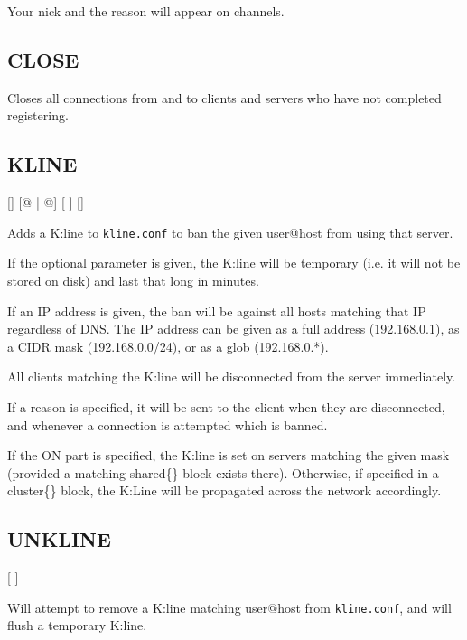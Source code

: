 	Your nick and the reason will appear on channels.


\subsection{CLOSE}


	Closes all connections from and to clients and servers who have not
	completed registering.


\subsection{KLINE}

    []
    [@ |
     @]
    [ ] []

	Adds a K:line to \nolinkurl{kline.conf} to ban the given user@host from
	using that server.

	If the optional parameter  is given, the K:line will
	be temporary (i.e. it will not be stored on disk) and last that long in
	minutes.

	If an IP address is given, the ban will be against all hosts matching
	that IP regardless of DNS. The IP address can be given as a full
	address (192.168.0.1), as a CIDR mask (192.168.0.0\slash24), or as a
	glob (192.168.0.*).

	All clients matching the K:line will be disconnected from the server
	immediately.

	If a reason is specified, it will be sent to the client when they are
	disconnected, and whenever a connection is attempted which is banned.


	If the ON part is specified, the K:line is set on servers matching the
	given mask (provided a matching shared\{\} block exists there).
	Otherwise, if specified in a cluster\{\} block, the K:Line will be
	propagated across the network accordingly.


\subsection{UNKLINE}

    [ ]

	Will attempt to remove a K:line matching user@host from
	\nolinkurl{kline.conf}, and will flush a temporary K:line.


